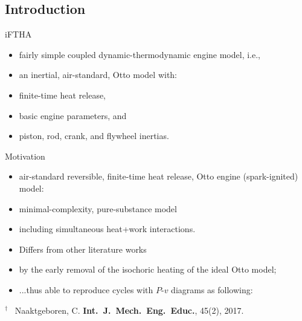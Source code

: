 \subsection{Introduction}

    \begin{frame}{iFTHA}\vspace*{-2em}
        \vspace*\medskipamount
        \begin{itemize}
            \item<1->  fairly simple \alert{coupled dynamic-thermodynamic} engine model, i.e.,
            \item<1->  an \alert{inertial}, \alert{air-standard}, Otto model with:
            \item<1->  \alert{finite-time} heat release,
            \item<1->  basic \alert{engine parameters}, and
            \item<1->  \alert{piston}, \alert{rod}, \alert{crank}, and \alert{flywheel}
                inertias.
        \end{itemize}
    \end{frame}

    \begin{frame}{Motivation}\vspace*{-2em}
        \vspace*\medskipamount
        \begin{itemize}
            \item<1->  \alert{air-standard reversible}, \alert{finite-time} heat release, Otto
                engine (spark-ignited) model:
            \item<1->  \alert{minimal-complexity}, \alert{pure-substance} model
            \item<1->  including \alert{simultaneous heat+work} interactions.
            \item<2->  \alert{Differs} from other literature works
            \item<2->  by the \alert{early removal} of the \alert{isochoric} heating of the
                ideal Otto model;
            \item<2->  ...thus able to reproduce cycles with \alert{$P$-$v$} diagrams as
                following:
        \end{itemize}\vspace*\bigskipamount
        {\footnotesize$^\dagger$~\color{Lgre}
        Naaktgeboren, C. \textbf{Int.~J.~Mech.~Eng.~Educ.}, 45(2), 2017.}
    \end{frame}

